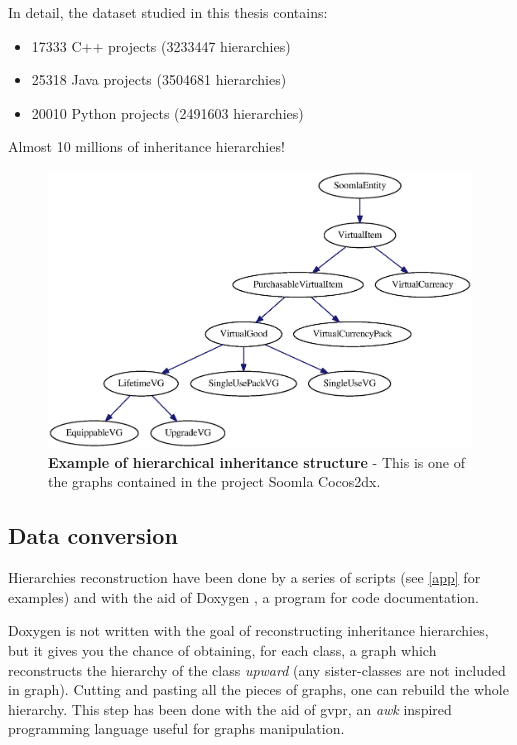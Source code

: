 In detail, the dataset studied in this thesis contains:
\begin{itemize}
\item 17333 C++ projects (3233447 hierarchies)
\item 25318 Java projects (3504681 hierarchies)
\item 20010 Python projects (2491603 hierarchies)
\end{itemize}
Almost 10 millions of inheritance hierarchies!
\newpage
\vphantom{cacca}
\vspace{3cm}
\begin{figure}[H]%
\includegraphics[width=\textwidth,draft=false]{images/soomla1.eps}
\caption{\label{gra1} \footnotesize\textbf{Example of hierarchical inheritance structure} - This is one of the graphs contained in the project Soomla Cocos2dx.}
\end{figure}
\newpage

\subsection{Data conversion}
Hierarchies reconstruction have been done by a series of scripts (see \ref{app} for examples) and with the aid of Doxygen \cite{doxy}, a program for code documentation.

Doxygen is not written with the goal of reconstructing inheritance hierarchies, but it gives you the chance of obtaining, for each class, a graph which reconstructs the hierarchy of the class \textit{upward} (any sister-classes are not included in graph). Cutting and pasting all the pieces of graphs, one can rebuild the whole hierarchy. This step has been done with the aid of gvpr, an \textit{awk} \cite{awk} inspired programming language useful for graphs manipulation.

